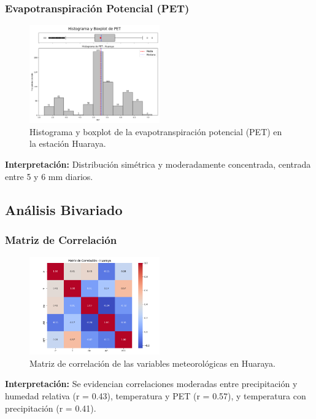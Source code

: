 \subsubsection*{Evapotranspiración Potencial (PET)}
\begin{figure}[H]
\centering
\includegraphics[width=0.5\textwidth]{resultados/por_estacion_meteorologica/Huaraya/PET_histograma.png}
\caption{Histograma y boxplot de la evapotranspiración potencial (PET) en la estación Huaraya.}
\label{fig:huaraya_PET}
\end{figure}
\textbf{Interpretación:} Distribución simétrica y moderadamente concentrada, centrada entre 5 y 6 mm diarios.

\subsection{Análisis Bivariado}

\subsubsection*{Matriz de Correlación}
\begin{figure}[H]
\centering
\includegraphics[width=0.5\textwidth]{resultados/por_estacion_meteorologica/Huaraya/matriz_correlacion.png}
\caption{Matriz de correlación de las variables meteorológicas en Huaraya.}
\label{fig:huaraya_corr}
\end{figure}
\textbf{Interpretación:} Se evidencian correlaciones moderadas entre precipitación y humedad relativa (r = 0.43), temperatura y PET (r = 0.57), y temperatura con precipitación (r = 0.41).

